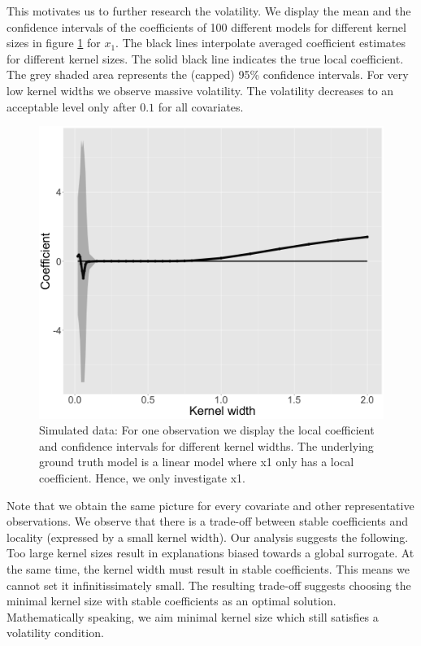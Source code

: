 \documentclass[
]{krantz}
\begin{document}
This motivates us to further research the volatility.
We display the mean and the confidence intervals of the coefficients of 100 different models for different kernel sizes in figure \ref{fig:lime-fig11} for \(x_1\).
The black lines interpolate averaged coefficient estimates for different kernel sizes.
The solid black line indicates the true local coefficient.
The grey shaded area represents the (capped) 95\% confidence intervals.
For very low kernel widths we observe massive volatility.
The volatility decreases to an acceptable level only after \(0.1\) for all covariates.

\begin{figure}

{\centering \includegraphics[width=0.99\linewidth]{images/04-09-11-1} 

}

\caption{Simulated data: For one observation we display the local coefficient and confidence intervals for different kernel widths. The underlying ground truth model is a linear model where x1 only has a local coefficient. Hence, we only investigate x1.}\label{fig:lime-fig11}
\end{figure}

Note that we obtain the same picture for every covariate and other representative observations.
We observe that there is a trade-off between stable coefficients and locality (expressed by a small kernel width).
Our analysis suggests the following.
Too large kernel sizes result in explanations biased towards a global surrogate.
At the same time, the kernel width must result in stable coefficients.
This means we cannot set it infinitissimately small.
The resulting trade-off suggests choosing the minimal kernel size with stable coefficients as an optimal solution.
Mathematically speaking, we aim minimal kernel size which still satisfies a volatility condition.
\end{document}
